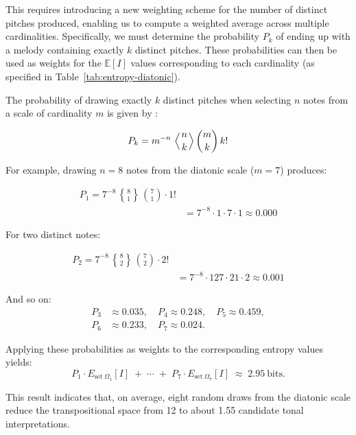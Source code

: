 \documentclass[10pt,twocolumn]{article}
\numberwithin{equation}{section} %
\newcommand{\Stirling}[2]{\genfrac\{\}{0pt}{}{#1}{#2}}
\begin{document}
    This requires introducing a new weighting scheme for the number of distinct pitches produced, enabling us to compute a weighted average across multiple cardinalities.
    Specifically, we must determine the probability $P_k$ of ending up with a melody containing exactly $k$ distinct pitches.
    These probabilities can then be used as weights for the $\mathbb{E}[I]$ values corresponding to each cardinality (as specified in Table~\ref{tab:entropy-diatonic}).

    The probability of drawing exactly $k$ distinct pitches when selecting $n$ notes from a scale of cardinality $m$ is given by \citet{Feller1968}:

    \begin{equation}
        P_k = m^{-n} \, \left\langle \genfrac{}{}{0pt}{}{n}{k} \right\rangle \binom{m}{k} \, k!
        \label{eq:Pk}
    \end{equation}

    For example, drawing $n = 8$ notes from the diatonic scale ($m = 7$) produces:

    \begin{align*}
        P_1 = 7^{-8} \, \Stirling{8}{1} \, \binom{7}{1} \cdot 1! \\
        &= 7^{-8} \cdot 1 \cdot 7 \cdot 1
        \approx 0.000
    \end{align*}

    For two distinct notes:

    \begin{align*}
        P_2 = 7^{-8} \, \Stirling{8}{2} \, \binom{7}{2} \cdot 2! \\
        &= 7^{-8} \cdot 127 \cdot 21 \cdot 2
        \approx 0.001
    \end{align*}

    And so on:
    \begin{align*}
        P_3 &\approx 0.035, \quad
        P_4 \approx 0.248, \quad
        P_5 \approx 0.459, \\
        P_6 &\approx 0.233, \quad
        P_7 \approx 0.024.
    \end{align*}

    Applying these probabilities as weights to the corresponding entropy values yields:
    \[
        P_1 \cdot E_{\text{set}~\Omega_1}[I] \;+\; \cdots \;+\; P_7 \cdot E_{\text{set}~\Omega_7}[I]
        \;\approx\; 2.95 \ \text{bits}.
    \]

    This result indicates that, on average, eight random draws from the diatonic scale reduce the transpositional space from 12 to about 1.55 candidate tonal interpretations.
\end{document}

